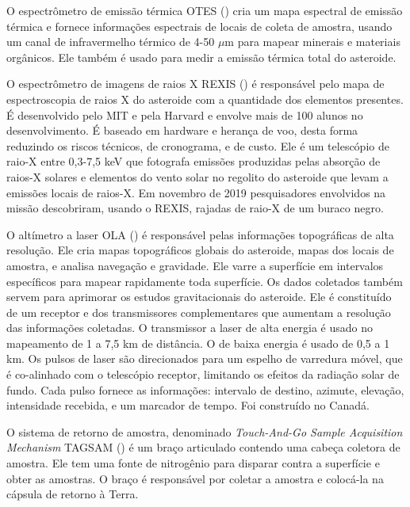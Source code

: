 O espectrômetro de emissão térmica OTES () cria um mapa espectral de emissão térmica e fornece informações espectrais de locais de coleta de amostra, usando um canal de infravermelho térmico de 4-50 $\mu$m para mapear minerais e materiais orgânicos. Ele também é usado para medir a emissão térmica total do asteroide.

O espectrômetro de imagens de raios X REXIS () é responsável pelo mapa de espectroscopia de raios X do asteroide com a quantidade dos elementos presentes. É desenvolvido pelo MIT e pela Harvard e envolve mais de 100 alunos no desenvolvimento. É baseado em hardware e herança de voo, desta forma reduzindo os riscos técnicos, de cronograma, e de custo. Ele é um telescópio de raio-X entre 0,3-7,5 keV que fotografa emissões produzidas pelas absorção de raios-X solares e elementos do vento solar no regolito do asteroide que levam a emissões locais de raios-X. Em novembro de 2019 pesquisadores envolvidos na missão descobriram, usando o REXIS, rajadas de raio-X de um buraco negro.

O altímetro a laser OLA () é responsável pelas informações topográficas de alta resolução. Ele cria mapas topográficos globais do asteroide, mapas dos locais de amostra, e analisa navegação e gravidade. Ele varre a superfície em intervalos específicos para mapear rapidamente toda superfície. Os dados coletados também servem para aprimorar os estudos gravitacionais do asteroide. Ele é constituído de um receptor e dos transmissores complementares que aumentam a resolução das informações coletadas. O transmissor a laser de alta energia é usado no mapeamento de 1 a 7,5 km de distância. O de baixa energia é usado de 0,5 a 1 km. Os pulsos de laser são direcionados para um espelho de varredura móvel, que é co-alinhado com o telescópio receptor, limitando os efeitos da radiação solar de fundo. Cada pulso fornece as informações: intervalo de destino, azimute, elevação, intensidade recebida, e um marcador de tempo. Foi construído no Canadá.

O sistema de retorno de amostra, denominado \textit{Touch-And-Go Sample Acquisition Mechanism} TAGSAM () é um braço articulado contendo uma cabeça coletora de amostra. Ele tem uma fonte de nitrogênio para disparar contra a superfície e obter as amostras. O braço é responsável por coletar a amostra e colocá-la na cápsula de retorno à Terra.


